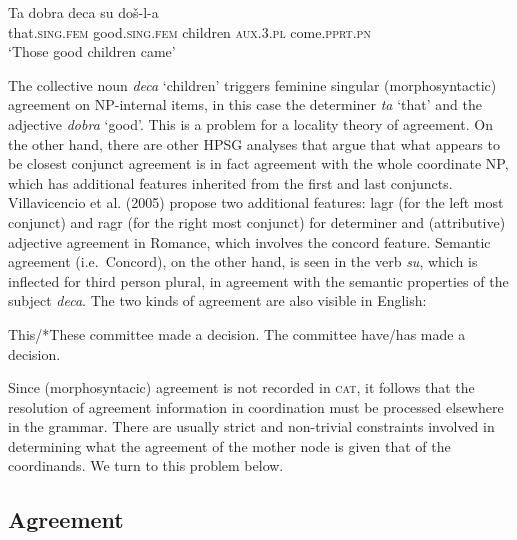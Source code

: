\documentclass[output=paper
                ,modfonts
                ,nonflat
	        ,collection
	        ,collectionchapter
	        ,collectiontoclongg
 	        ,biblatex
                ,babelshorthands
                ,newtxmath
                ,draftmode
                ,colorlinks, citecolor=brown
]{./langsci/langscibook}
\begin{document}
\begin{exe}
\ex \gll Ta dobra deca su do\v{s}-l-a\\
         that.\textsc{sing.fem} good.\textsc{sing.fem} children \textsc{aux}.\textsc{3.pl} come.\textsc{pprt.pn}\\
  \glt `Those good children came'   \\
  \citep[51]{wechsler} 
\end{exe}

\noindent
The collective noun \emph{deca} `children' triggers feminine singular (morphosyntactic) agreement on NP-internal items, in this case the determiner {\it ta} `that' and the adjective \emph{dobra} `good'.   This is a problem for a locality theory of agreement. On the other hand, there are other HPSG analyses that argue that what appears to be closest conjunct agreement is in fact agreement with the whole coordinate NP, which has additional features inherited from the first and last conjuncts. Villavicencio et al. (2005) propose two additional features: {\sc lagr} (for the left most conjunct) and {\sc ragr} (for the right most conjunct) for determiner and (attributive) adjective agreement in Romance, which involves the {\sc concord} feature.
Semantic agreement (i.e.\ Concord), on the other hand, is seen in the verb \emph{su}, which  is inflected for third person plural, in agreement with the semantic properties of the subject \emph{deca}. The two kinds of agreement are also visible in
English:

\begin{exe}
\ex
\begin{xlista}
\ex This/*These committee made a decision.
\ex The committee have/has made a decision.
\end{xlista}
\end{exe}


\noindent
Since (morphosyntacic) agreement is not recorded in \textsc{cat}, it follows that the resolution of agreement information in coordination must be processed elsewhere in the grammar. There are usually strict and non-trivial constraints involved in determining what the agreement of the mother node is given that of the coordinands. We turn to this problem below.







\subsection{Agreement}
\end{document}
